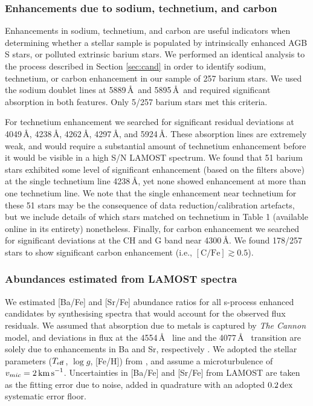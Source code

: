 \documentclass[a4paper,fleqn,usenatbib]{mnras}
\begin{document}
\subsubsection{Enhancements due to sodium, technetium, and carbon} \label{sec:other enhancements}
Enhancements in sodium, technetium, and carbon are useful indicators when determining whether a stellar sample is populated by intrinsically enhanced AGB S stars, or polluted extrinsic barium stars. We performed an identical analysis to the process described in Section \ref{sec:cand} in order to identify sodium, technetium, or carbon enhancement in our sample of 257 barium stars. We used the sodium doublet lines at 5889\,\AA\ and 5895\,\AA\, and required significant absorption in both features. Only 5/257 barium stars met this criteria.

For technetium enhancement we searched for significant residual deviations at 4049\,\AA, 4238\,\AA, 4262\,\AA, 4297\,\AA, and 5924\,\AA. These absorption lines are extremely weak, and would require a substantial amount of technetium enhancement before it would be visible in a high S/N LAMOST spectrum. We found that 51 barium stars exhibited some level of significant enhancement (based on the filters above) at the single technetium line 4238\,\AA, yet none showed enhancement at more than one technetium line. We note that the single enhancement near technetium for these 51 stars may be the consequence of data reduction/calibration artefacts, but we include details of which stars matched on technetium in Table 1 (available online in its entirety) nonetheless.
Finally, for carbon enhancement we searched for significant deviations at the CH and G band near 4300\,\AA. We found 178/257 stars to show significant carbon enhancement (i.e., $[\textrm{C/Fe}] \gtrsim 0.5$). 



\subsubsection{Abundances estimated from LAMOST spectra}
We estimated [Ba/Fe] and [Sr/Fe] abundance ratios for all s-process enhanced candidates by synthesising spectra that would account for the observed flux residuals. We assumed that absorption due to metals is captured by \emph{The Cannon} model, and deviations in flux at the 4554\,\AA\  line and the 4077\,\AA\  transition are solely due to enhancements in Ba and Sr, respectively \citep{marcs,sme,vald,ispec}. We adopted the stellar parameters ($T_{\rm eff}$, $\log{g}$, [Fe/H]) from \citet{ho2017}, and assume a microturbulence of $v_{mic} = 2\,{\rm km\,s}^{-1}$. Uncertainties in [Ba/Fe] and [Sr/Fe] from LAMOST are taken as the fitting error due to noise, added in quadrature with an adopted $0.2\,{\rm dex}$ systematic error floor.
\end{document}
